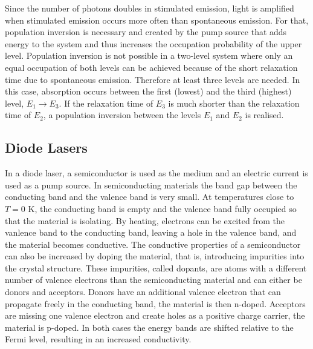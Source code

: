 Since the number of photons doubles in stimulated emission, light is amplified when 
stimulated emission occurs more often than spontaneous emission. For that, population inversion
is necessary and created by the pump source that adds energy to the 
system and thus increases the occupation probability of the upper level.                                                                                                                                                                                                                                                                                                                                                                                                                                                                                                                                                                                                         
Population inversion is not possible in a two-level system where only an equal occupation of 
both levels can be achieved because of the short relaxation time due to spontaneous emission.
Therefore at least three levels are needed. In this case, absorption occurs between the first (lowest)
and the third (highest) level, $E_1 \rightarrow E_3$. If the relaxation time of $E_3$ is 
much shorter than the relaxation time of $E_2$, a population inversion between the levels 
$E_1$ and $E_2$ is realised.

\subsection*{Diode Lasers}
In a diode laser, a semiconductor is used as the medium and an electric current is used as a 
pump source. 
In semiconducting materials the band gap between the conducting band and the valence band is very small. %
At temperatures close to $T = 0 \text{ K}$, the conducting band is empty and the valence 
band fully occupied so that the material is isolating. 
By heating, electrons can be excited from the vanlence band to the conducting band, leaving
a hole in the valence band, and the material becomes conductive. 
The conductive properties of a semiconductor can also be increased by doping the material,
that is, introducing impurities into the crystal structure. These impurities, called dopants, are atoms with a 
different number of valence electrons than the semiconducting material and 
can either be donors and acceptors. 
Donors have an additional valence electron that can propagate freely in the conducting band,
the material is then n-doped. 
Acceptors are missing one valence electron and create holes as a positive charge carrier, the 
material is p-doped.
In both cases the energy bands are shifted relative to the Fermi level, resulting in an 
increased conductivity.

